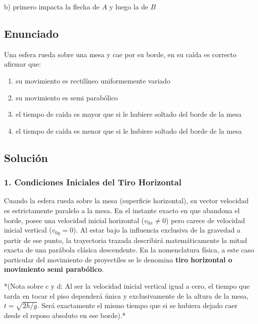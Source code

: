 \documentclass[12pt, a4paper]{article}
\begin{document}
\begin{tcolorbox}[colback=green!5!white, colframe=green!50!black, title=Respuesta Final]
\centering \Large b) primero impacta la flecha de $A$ y luego la de $B$
\end{tcolorbox}

\newpage

\subsection*{Enunciado}
Una esfera rueda sobre una mesa y cae por su borde, en su caída es correcto afirmar que:
\begin{enumerate}[label=\alph*)]
    \item su movimiento es rectilíneo uniformemente variado
    \item su movimiento es semi parabólico
    \item el tiempo de caída es mayor que si le hubiere soltado del borde de la mesa
    \item el tiempo de caída es menor que si le hubiere soltado del borde de la mesa
\end{enumerate}

\subsection*{Solución}

\subsubsection*{1. Condiciones Iniciales del Tiro Horizontal}
Cuando la esfera rueda sobre la mesa (superficie horizontal), su vector velocidad es estrictamente paralelo a la mesa. En el instante exacto en que abandona el borde, posee una velocidad inicial horizontal ($v_{0x} \neq 0$) pero carece de velocidad inicial vertical ($v_{0y} = 0$).
Al estar bajo la influencia exclusiva de la gravedad a partir de ese punto, la trayectoria trazada describirá matemáticamente la mitad exacta de una parábola clásica descendente. En la nomenclatura física, a este caso particular del movimiento de proyectiles se le denomina \textbf{tiro horizontal o movimiento semi parabólico}.

*(Nota sobre c y d: Al ser la velocidad inicial vertical igual a cero, el tiempo que tarda en tocar el piso dependerá única y exclusivamente de la altura de la mesa, $t = \sqrt{2h/g}$. Será exactamente el mismo tiempo que si se hubiera dejado caer desde el reposo absoluto en ese borde).*
\end{document}
